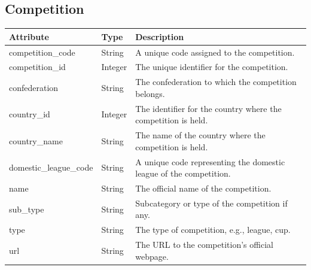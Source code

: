 \documentclass{Configuration_Files/PoliMi3i_thesis}
\begin{document}
\subsection*{Competition}
\begin{longtable}{|p{4cm}|p{3cm}|p{8cm}|}
\hline
\textbf{Attribute} & \textbf{Type} & \textbf{Description} \\
\hline
\endhead
competition\_code & String & A unique code assigned to the competition. \\
competition\_id & Integer & The unique identifier for the competition. \\
confederation & String & The confederation to which the competition belongs. \\
country\_id & Integer & The identifier for the country where the competition is held. \\
country\_name & String & The name of the country where the competition is held. \\
domestic\_league\_code & String & A unique code representing the domestic league of the competition. \\
name & String & The official name of the competition. \\
sub\_type & String & Subcategory or type of the competition if any. \\
type & String & The type of competition, e.g., league, cup. \\
url & String & The URL to the competition's official webpage. \\
\hline
\end{longtable}

\newpage
\end{document}
